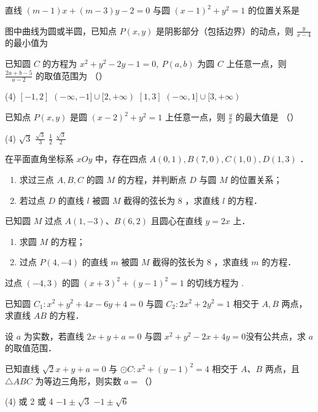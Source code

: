 \begin{problemset}
    \item 直线 $(m-1) x+(m-3) y-2=0$ 与圆 $(x-1)^2+y^2=1$ 的位置关系是 \underline{\qquad}
    \item 图中曲线为圆或半圆，已知点 $P(x, y)$ 是阴影部分（包括边界）的动点，则 $\frac{y}{x-4}$ 的最小值为 \underline{\qquad}
    \begin{figure} [H]
        \centering
        \resizebox{0.2\textwidth}{!}{}
    \end{figure}
    \item 已知圆 $C$ 的方程为 $x^2+y^2-2 y-1=0, ~ P(a, b)$ 为圆 $C$ 上任意一点，则 $\frac{2 a+b-5}{a-2}$ 的取值范围为 （\qquad）
    \begin{tasks}(4)
        \task $[-1,2]$
        \task $(-\infty,-1] \cup[2,+\infty)$
                    \task $[1,3]$
                    \task $(-\infty, 1] \cup[3,+\infty)$
    \end{tasks}
    \item 已知点 $P(x, y)$ 是圆 $(x-2)^2+y^2=1$ 上任意一点，则 $\frac{y}{x}$ 的最大值是 （\qquad）
    \begin{tasks}(4)
        \task $\sqrt{3}$
        \task $\frac{\sqrt{3}}{3}$
        \task $\frac{1}{2}$
        \task $\frac{\sqrt{3}}{2}$
    \end{tasks}
    \item 在平面直角坐标系 $x O y$ 中，存在四点 $A(0,1), B(7,0), C(1,0), D(1,3)$ ．
    \begin{enumerate}
        \item 求过三点 $A, B, C$ 的圆 $M$ 的方程，并判断点 $D$ 与圆 $M$ 的位置关系；

        \item 若过点 $D$ 的直线 $l$ 被圆 $M$ 截得的弦长为 8 ，求直线 $l$ 的方程．
    \end{enumerate}
    \item 已知圆 $M$ 过点 $A(1,-3)$、$B(6,2)$ 且圆心在直线 $y=2 x$ 上．
    \begin{enumerate}
        \item 求圆 $M$ 的方程；
        \item 过点 $P(4,-4)$ 的直线 $m$ 被圆 $M$ 截得的弦长为 8 ，求直线 $m$ 的方程．
    \end{enumerate}
    \item 过点 $(-4,3)$ 的圆 $(x+3)^2+(y-1)^2=1$ 的切线方程为 \underline{\qquad}.
    \item 已知圆 $C_1: x^2+y^2+4 x-6 y+4=0$ 与圆 $C_2: 2 x^2+2 y^2=1$ 相交于 $A, B$ 两点，求直线 $A B$ 的方程．
    \item 设 $a$ 为实数，若直线 $2 x+y+a=0$ 与圆 $x^2+y^2-2 x+4 y=0$没有公共点，求 $a$ 的取值范围．
    \item 已知直线 $\sqrt{2} x+y+a=0$ 与 $\odot C: x^2+(y-1)^2=4$ 相交于 $A$、$ B$ 两点，且 $\triangle A B C$ 为等边三角形，则实数 $a=$（\quad）
    \begin{tasks}(4)
         或 2
         或 4
        \task $-1 \pm \sqrt{3}$
        \task $-1 \pm \sqrt{6}$
    \end{tasks}
\end{problemset}

